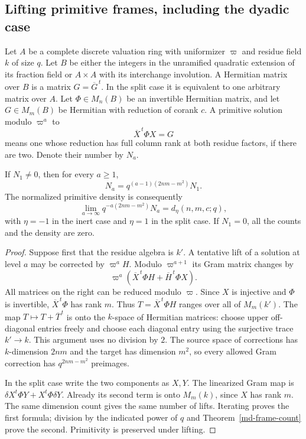 


\subsection{Lifting primitive frames, including the dyadic case}

Let $A$ be a complete discrete valuation ring with uniformizer
$\varpi$ and residue field $k$ of size $q$. Let $B$ be either
the integers in the unramified quadratic extension of its fraction
field or $A\times A$ with its interchange involution. A Hermitian
matrix over $B$ is a matrix $G=\overline G^{\,t}$. In the split
case it is equivalent to one arbitrary matrix over $A$.
Let $\Phi\in M_n(B)$ be an invertible Hermitian matrix, and let
$G\in M_m(B)$ be Hermitian with reduction of corank $c$.
A primitive solution modulo $\varpi^a$ to
\[
                         \overline X^{\,t}\Phi X=G
\]
means one whose reduction has full column rank at both residue
factors, if there are two. Denote their number by $N_a$.

\begin{proposition}\label{md-lifting}
If $N_1\ne0$, then for every $a\geq1$,
\[
 N_a=q^{(a-1)(2nm-m^2)}N_1.
\]
The normalized primitive density is consequently
\[
 \lim_{a\to\infty}q^{-a(2nm-m^2)}N_a
                        =d_\eta(n,m,c;q),
\]
with $\eta=-1$ in the inert case and $\eta=1$ in the split case.
If $N_1=0$, all the counts and the density are zero.
\end{proposition}

\begin{proof}
Suppose first that the residue algebra is $k'$. A tentative lift
of a solution at level $a$ may be corrected by $\varpi^aH$.
Modulo $\varpi^{a+1}$ its Gram matrix changes by
\[
        \varpi^a(\overline X^{\,t}\Phi H+
                                      \overline H^{\,t}\Phi X).
\]
All matrices on the right can be reduced modulo $\varpi$.
Since $X$ is injective and $\Phi$ is invertible,
$\overline X^{\,t}\Phi$ has rank $m$. Thus
$T=\overline X^{\,t}\Phi H$ ranges over all of $M_m(k')$.
The map $T\mapsto T+\overline T^{\,t}$ is onto the
$k$-space of Hermitian matrices: choose upper off-diagonal
entries freely and choose each diagonal entry using the
surjective trace $k'\to k$. This argument uses no division by $2$.
The source space of corrections has $k$-dimension $2nm$ and the
target has dimension $m^2$, so every allowed Gram correction has
$q^{2nm-m^2}$ preimages.

In the split case write the two components as $X,Y$.
The linearized Gram map is
$\delta X^t\Phi Y+X^t\Phi\delta Y$. Already its second
term is onto $M_m(k)$, since $X$ has rank $m$.
The same dimension count gives the same number of lifts.
Iterating proves the first formula; division by the indicated
power of $q$ and Theorem~\ref{md-frame-count} prove the second.
Primitivity is preserved under lifting.
\end{proof}

